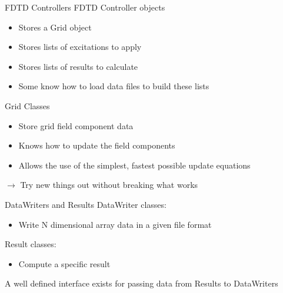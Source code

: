 \documentclass[pdf, nototal, slideBW]{prosper}
\newcommand{\insgraphic}[2]{
  \begin{center}
    \scalebox{#1}{
      \texttt{[image: \#2]}
    }
  \end{center}
}
\begin{document}
\begin{slide}{FDTD Controllers}
  FDTD Controller objects
  \begin{itemize}
  \item Stores a Grid object
  \item Stores lists of excitations to apply
  \item Stores lists of results to calculate
  \item Some know how to load data files to build these lists
  \end{itemize}

  
\end{slide}

\begin{slide}{Grid Classes}
  \begin{itemize}
  \item Store grid field component data
  \item Knows how to update the field components
  \item Allows the use of the simplest, fastest possible update
    equations 
  \end{itemize}

  $\rightarrow$ Try new things out without breaking what works

  \insgraphic{0.75}{grid-classes.eps}
\end{slide}

\begin{slide}{DataWriters and Results}
  DataWriter classes:
  \begin{itemize}
  \item Write N dimensional array data in a given file format
  \end{itemize}

  Result classes:
  \begin{itemize}
  \item Compute a specific result 
  \end{itemize}
  
  A well defined interface exists for passing data from Results to
  DataWriters

\end{slide}

\end{document}
